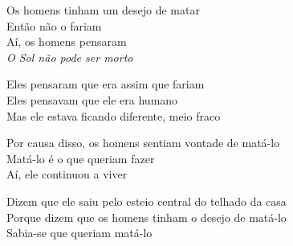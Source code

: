 \bigskip

\begin{linenumbers}\begingroup\raggedright
\noindent Os homens tinham um desejo de matar\\
Então não o fariam\\
Aí, os homens pensaram\\
\textit{O Sol não pode ser morto}
\end{linenumbers}\endgroup

\bigskip

\begin{linenumbers}\begingroup\raggedright
\noindent Eles pensaram que era assim que fariam\\
Eles pensavam que ele era humano\\
Mas ele estava ficando diferente, meio fraco
\end{linenumbers}\endgroup

\bigskip

\begin{linenumbers}\begingroup\raggedright
\noindent Por causa disso, os homens sentiam vontade de matá-lo\\
Matá-lo é o que queriam fazer\\
Aí, ele continuou a viver
\end{linenumbers}\endgroup

\bigskip

\begin{linenumbers}\begingroup\raggedright
\noindent Dizem que ele saiu pelo esteio central do telhado da casa\\
Porque dizem que os homens tinham o desejo de matá-lo\\
Sabia-se que queriam matá-lo
\end{linenumbers}\endgroup

\bigskip

